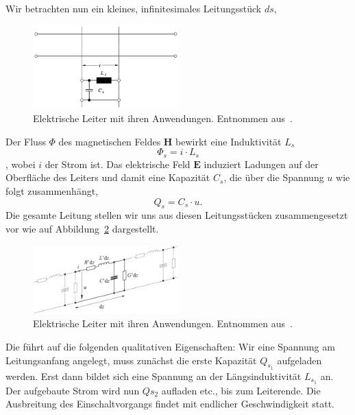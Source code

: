 \documentclass[paper=a4, parskip=half-, ngerman, fontsize=11pt]{scrreprt}
\begin{document}
Wir betrachten nun ein kleines, infinitesimales Leitungsstück $ds$,
\begin{figure}[!h]
    \begin{center}
        \includegraphics[width=0.5\textwidth]{images/Leitung1.png}
        \caption{Elektrische Leiter mit ihren Anwendungen. Entnommen aus~\cite{LeitungenUndFilter}.}
        \label{Leitung1}
    \end{center}
\end{figure}

Der Fluss $\Phi$ des magnetischen Feldes $\textbf{H}$ bewirkt eine Induktivität $L_{s}$
\[ \Phi_{s} = i \cdot L_{s} \], wobei $i$ der Strom ist.
Das elektrische Feld $\textbf{E}$ induziert Ladungen auf der Oberfläche des Leiters und damit eine Kapazität $C_{s}$,
die über die Spannung $u$ wie folgt zusammenhängt,
\[ Q_{s} = C_{s} \cdot u . \]
Die gesamte Leitung stellen wir uns aus diesen Leitungsstücken zusammengesetzt vor wie auf Abbildung~\ref{Leitung2}
dargestellt.
\begin{figure}[!h]
    \begin{center}
        \includegraphics[width=0.5\textwidth]{images/Leitung2.png}
        \caption{Elektrische Leiter mit ihren Anwendungen. Entnommen aus~\cite{LeitungenUndFilter}.}
        \label{Leitung2}
    \end{center}
\end{figure}
Die führt auf die folgenden qualitativen Eigenschaften: Wir eine Spannung am Leitungsanfang angelegt, muss zunächst die
erste Kapazität $Q_{s_{1}}$ aufgeladen werden. Erst dann bildet sich eine Spannung an der Längsinduktivität $L_{s_{1}}$
an. Der aufgebaute Strom wird nun $Q{s_{2}}$ aufladen etc., bis zum Leiterende. Die Ausbreitung des Einschaltvorgangs
findet mit endlicher Geschwindigkeit statt.
\end{document}
